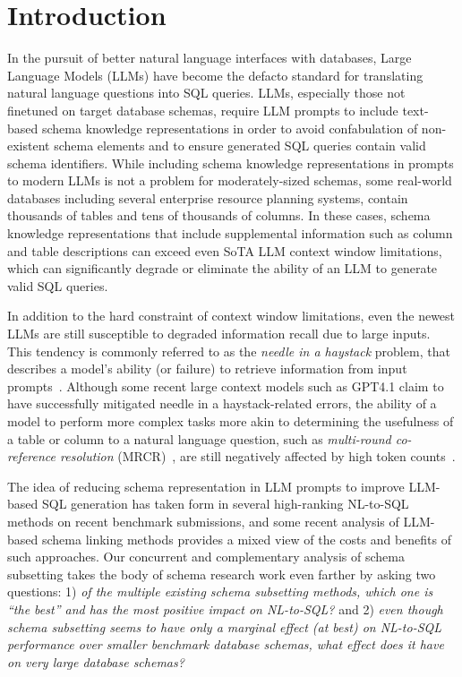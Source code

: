 \section{Introduction}


In the pursuit of better natural language interfaces with databases, Large Language Models (LLMs) have become the defacto standard for translating natural language questions into SQL queries.
LLMs, especially those not finetuned on target database schemas, require LLM prompts to include text-based schema knowledge representations in order to avoid confabulation of non-existent schema elements and to ensure generated SQL queries contain valid schema identifiers.
While including schema knowledge representations in prompts to modern LLMs is not a problem for moderately-sized schemas, some real-world databases including several enterprise resource planning systems, contain thousands of tables and tens of thousands of columns.
In these cases, schema knowledge representations that include supplemental information such as column and table descriptions can exceed even SoTA LLM context window limitations, which can significantly degrade or eliminate the ability of an LLM to generate valid SQL queries.

In addition to the hard constraint of context window limitations, even the newest LLMs are still susceptible to degraded information recall due to large inputs. 
This tendency is commonly referred to as the \emph{needle in a haystack} problem, that describes a model's ability (or failure) to retrieve information from input prompts~\cite{hsieh2024ruler}.
Although some recent large context models such as GPT4.1 claim to have successfully mitigated needle in a haystack-related errors, the ability of a model to perform more complex tasks more akin to determining the usefulness of a table or column to a natural language question, such as \emph{multi-round co-reference resolution} (MRCR)~\cite{vodrahalli2024michelangelolongcontextevaluations}, are still negatively affected by high token counts~\cite{openai2025gpt41}.

The idea of reducing schema representation in LLM prompts to improve LLM-based SQL generation has taken form in several high-ranking NL-to-SQL methods on recent benchmark submissions, and some recent analysis of LLM-based schema linking methods provides a mixed view of the costs and benefits of such approaches.
Our concurrent and complementary analysis of schema subsetting takes the body of schema research work even farther by asking two questions: 1) \emph{of the multiple existing schema subsetting methods, which one is ``the best'' and has the most positive impact on NL-to-SQL?} and 2) \emph{even though schema subsetting seems to have only a marginal effect (at best) on NL-to-SQL performance over smaller benchmark database schemas, what effect does it have on very large database schemas?} 

